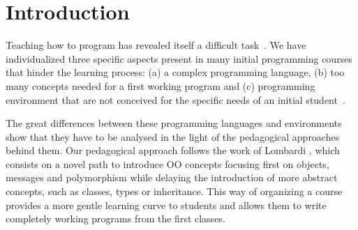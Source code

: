 \section{Introduction}
\label{sec:intro}



Teaching how to program has revealed itself a difficult task~\cite{dijkstra_89a, jenkins2002difficulty}.
We have individualized three specific aspects present in many initial programming courses that hinder the learning process: 
(a) a complex programming language,
(b) too many concepts needed for a first working program and
(c) programming environment that are not conceived for the specific needs of an initial student~\cite{singh2012}.



\medskip

The great differences between these programming languages and environments show that they have to be analysed in the light of the pedagogical approaches behind them.
Our pedagogical approach follows the work of Lombardi \etal
\cite{lombardi_instances_2007,lombardi_carlos_alumnos_2008,spigariol_lucas_ensenando_2013,passerini2017wollok}, 
which consists on a novel path to introduce OO concepts focusing first on objects, messages and polymorphism 
while delaying the introduction of more abstract concepts,
such as classes, types or inheritance.
This way of organizing a course provides a more gentle learning curve to students and allows them to write completely working programs from the first classes.

